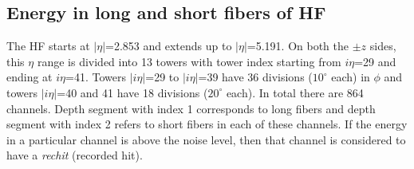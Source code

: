 \subsection{Energy in long and short fibers of HF}
The HF starts at $|\eta|$=2.853 and extends up to $|\eta|$=5.191. On 
both the $\pm z$ sides, this $\eta$ range is divided into 13 towers 
with tower index starting from $i\eta$=29 and ending at $i\eta$=41. 
Towers $|i\eta|$=29 to $|i\eta|$=39 have 36 divisions ($10^\circ$ each) 
in $\phi$ and towers $|i\eta|$=40 and 41 have 18 
divisions ($20^\circ$ each). In total there are 864 channels. Depth 
segment with index 1 corresponds to long fibers and depth segment
with index 2 refers to short fibers in each of these channels.
If the energy in a particular channel is above the noise level, then that channel is 
considered to have a \textit{rechit} (recorded hit).

